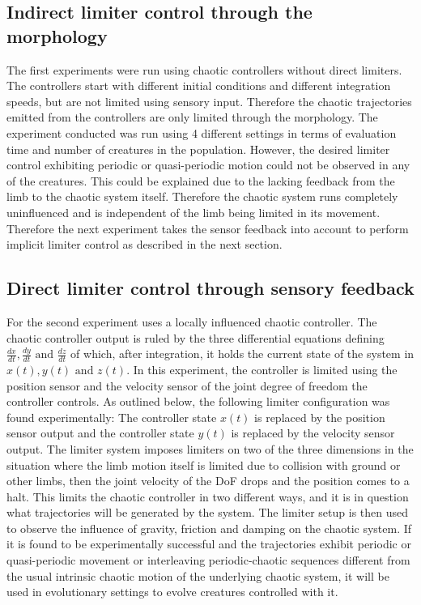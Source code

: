 \documentclass[main]{subfiles}
\begin{document}
\subsection{Indirect limiter control through the morphology}

The first experiments were run using chaotic controllers without direct limiters. %
%
The controllers start with different initial conditions and different integration speeds, but are not limited using sensory input. %
%
Therefore the chaotic trajectories emitted from the controllers are only limited through the morphology. %
%
The experiment conducted was run using 4 different settings in terms of evaluation time and number of creatures in the population. %
%
However, the desired limiter control exhibiting periodic or quasi-periodic motion could not be observed in any of the creatures. %
%
This could be explained due to the lacking feedback from the limb to the chaotic system itself. %
%
Therefore the chaotic system runs completely uninfluenced and is independent of the limb being limited in its movement. %
%
Therefore the next experiment takes the sensor feedback into account to perform implicit limiter control as described in the next section.

\subsection{Direct limiter control through sensory feedback}

For the second experiment uses a locally influenced chaotic controller. %
%
The chaotic controller output is ruled by the three differential equations defining \(\frac{dx}{dt},\frac{dy}{dt} \text{ and } \frac{dz}{dt}\) of which, after integration, it holds the current state of the system in \(x(t),y(t) \text{ and } z(t)\). %
%
In this experiment, the controller is limited using the position sensor and the velocity sensor of the joint degree of freedom the controller controls. %
%
As outlined below, the following limiter configuration was found experimentally: The controller state \(x(t)\) is replaced by the position sensor output and the controller state \(y(t)\) is replaced by the velocity sensor output. %
%
The limiter system imposes limiters on two of the three dimensions in the situation where the limb motion itself is limited due to collision with ground or other limbs, then the joint velocity of the DoF drops and the position comes to a halt. %
%
This limits the chaotic controller in two different ways, and it is in question what trajectories will be generated by the system. %
%
The limiter setup is then used to observe the influence of gravity, friction and damping on the chaotic system. %
%
If it is found to be experimentally successful and the trajectories exhibit periodic or quasi-periodic movement or interleaving periodic-chaotic sequences different from the usual intrinsic chaotic motion of the underlying chaotic system, it will be used in evolutionary settings to evolve creatures controlled with it.
\end{document}
